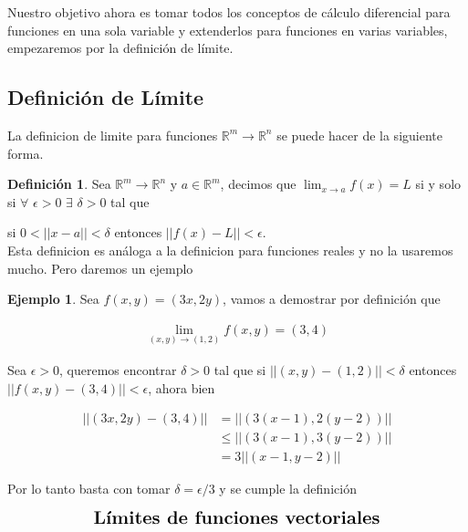 \documentclass{article}
\theoremstyle{plain}
\theoremstyle{definition}
\newtheorem{defin}[thm]{Definición}
\newtheorem{ejem}[thm]{Ejemplo}
\begin{document}
Nuestro objetivo ahora es tomar todos los conceptos de cálculo diferencial para funciones en una sola variable y extenderlos para funciones en varias variables, empezaremos por la definición de límite. \\



\subsection{Definición de Límite}

La definicion de limite para funciones $\mathbb{R}^m \to \mathbb{R}^n$ se puede hacer de la siguiente forma. \\

\begin{defin}Sea $\mathbb{R}^m \to \mathbb{R}^n$ y $a \in \mathbb{R}^m$, decimos que $\displaystyle \lim_{x \to a} f(x) = L$ si y solo si $\forall$ $\epsilon > 0$ $\exists$ $\delta >0$ tal que
\end{defin}
si $ 0 < ||x-a|| < \delta$ entonces $||f(x)-L|| < \epsilon$. \\


Esta definicion es análoga a la definicion para funciones reales y no la usaremos mucho. Pero daremos un ejemplo\\

\begin{ejem}Sea $f(x,y) = (3x,2y)$, vamos a demostrar por definici\'on que
\end{ejem}

\begin{align*}
     \lim_{(x,y) \to (1,2)} f(x,y) = (3,4)
\end{align*}

Sea $\epsilon >0$, queremos encontrar $\delta >0$ tal que si $||(x,y)-(1,2)|| < \delta$ entonces $|| f(x,y)-(3,4)|| < \epsilon$,  ahora bien

\begin{align*}
     ||(3x,2y)-(3,4)|| &= ||(3(x-1),2(y-2))|| \\
                      &\leq  ||(3(x-1),3(y-2))|| \\
     &= 3|| (x-1,y-2)||
\end{align*}

Por lo tanto basta con tomar $\delta = \epsilon/3$ y se cumple la definici\'on

\newpage

\begin{align*}
    \Large{\textbf{Límites de funciones vectoriales}}
\end{align*}
\end{document}
